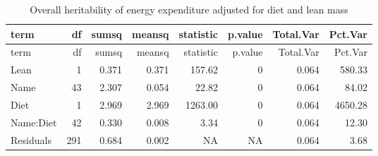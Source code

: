 \documentclass[]{article}
\newenvironment{Shaded}{\begin{snugshade}}{\end{snugshade}}
\newcommand{\DataTypeTok}[1]{\textcolor[rgb]{0.13,0.29,0.53}{#1}}
\newcommand{\DecValTok}[1]{\textcolor[rgb]{0.00,0.00,0.81}{#1}}
\newcommand{\KeywordTok}[1]{\textcolor[rgb]{0.13,0.29,0.53}{\textbf{#1}}}
\newcommand{\NormalTok}[1]{#1}
\newcommand{\OperatorTok}[1]{\textcolor[rgb]{0.81,0.36,0.00}{\textbf{#1}}}
\newcommand{\StringTok}[1]{\textcolor[rgb]{0.31,0.60,0.02}{#1}}
\begin{document}
\begin{Shaded}
\end{Shaded}

\begin{longtable}[]{@{}lrrrrrrr@{}}
\caption{Overall heritability of energy expenditure adjusted for diet
and lean mass}\tabularnewline
\toprule
term & df & sumsq & meansq & statistic & p.value & Total.Var &
Pct.Var\tabularnewline
\midrule
\endfirsthead
\toprule
term & df & sumsq & meansq & statistic & p.value & Total.Var &
Pct.Var\tabularnewline
\midrule
\endhead
Lean & 1 & 0.371 & 0.371 & 157.62 & 0 & 0.064 & 580.33\tabularnewline
Name & 43 & 2.307 & 0.054 & 22.82 & 0 & 0.064 & 84.02\tabularnewline
Diet & 1 & 2.969 & 2.969 & 1263.00 & 0 & 0.064 & 4650.28\tabularnewline
Name:Diet & 42 & 0.330 & 0.008 & 3.34 & 0 & 0.064 & 12.30\tabularnewline
Residuals & 291 & 0.684 & 0.002 & NA & NA & 0.064 & 3.68\tabularnewline
\bottomrule
\end{longtable}
\end{document}

